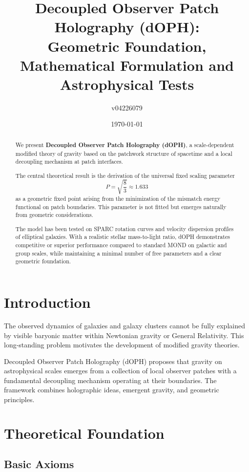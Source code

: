 \documentclass[12pt,a4paper]{article}
\title{Decoupled Observer Patch Holography (dOPH): \\
Geometric Foundation, Mathematical Formulation and Astrophysical Tests}
\author{v04226079}
\date{\today}
\begin{document}
\maketitle

\begin{abstract}
We present \textbf{Decoupled Observer Patch Holography (dOPH)}, a scale-dependent modified theory of gravity based on the patchwork structure of spacetime and a local decoupling mechanism at patch interfaces.

The central theoretical result is the derivation of the universal fixed scaling parameter 
\[
P = \sqrt{\frac{8}{3}} \approx 1.633
\]
as a geometric fixed point arising from the minimization of the mismatch energy functional on patch boundaries. This parameter is not fitted but emerges naturally from geometric considerations.

The model has been tested on SPARC rotation curves and velocity dispersion profiles of elliptical galaxies. With a realistic stellar mass-to-light ratio, dOPH demonstrates competitive or superior performance compared to standard MOND on galactic and group scales, while maintaining a minimal number of free parameters and a clear geometric foundation.
\end{abstract}

\section{Introduction}

The observed dynamics of galaxies and galaxy clusters cannot be fully explained by visible baryonic matter within Newtonian gravity or General Relativity. This long-standing problem motivates the development of modified gravity theories.

Decoupled Observer Patch Holography (dOPH) proposes that gravity on astrophysical scales emerges from a collection of local observer patches with a fundamental decoupling mechanism operating at their boundaries. The framework combines holographic ideas, emergent gravity, and geometric principles.

\section{Theoretical Foundation}

\subsection{Basic Axioms}
\end{document}
